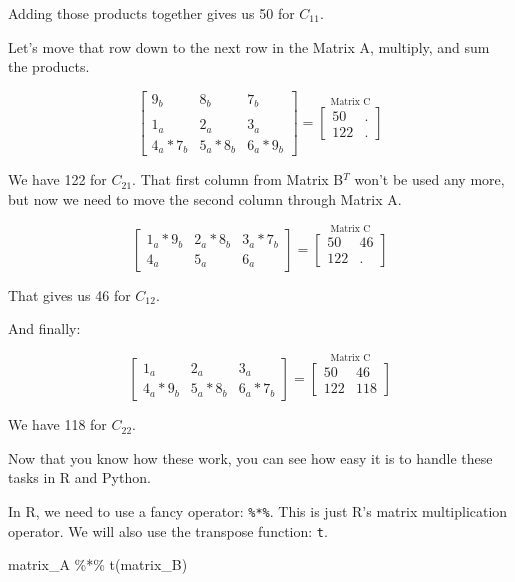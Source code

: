 \documentclass[
]{krantz}
\newenvironment{Shaded}{\begin{snugshade}}{\end{snugshade}}
\newcommand{\FunctionTok}[1]{\textcolor[rgb]{0.28,0.35,0.67}{#1}}
\newcommand{\NormalTok}[1]{\textcolor[rgb]{0.00,0.23,0.31}{#1}}
\newcommand{\SpecialCharTok}[1]{\textcolor[rgb]{0.37,0.37,0.37}{#1}}
\begin{document}
Adding those products together gives us 50 for \(C_{11}\).

Let's move that row down to the next row in the Matrix A, multiply, and
sum the products.

\[
\begin{bmatrix}
9_{b} & 8_{b} & 7_{b} \\
\\
1_{a} & 2_{a} & 3_{a}\\
4_{a}*7_{b} & 5_{a}*8_{b} & 6_{a}*9_{b}
\end{bmatrix}
= 
\stackrel{\mbox{Matrix C}}{
\begin{bmatrix}
50 & .\\
122 & .
\end{bmatrix}
}
\]

We have 122 for \(C_{21}\). That first column from Matrix B\(^T\) won't
be used any more, but now we need to move the second column through
Matrix A.

\[
\begin{bmatrix}
1_{a}*9_{b} & 2_{a}*8_{b} & 3_{a}*7_{b}\\
4_{a} & 5_{a} & 6_{a}
\end{bmatrix}
= 
\stackrel{\mbox{Matrix C}}{
\begin{bmatrix}
50 & 46\\
122 & .
\end{bmatrix}
}
\]

That gives us 46 for \(C_{12}\).

And finally:

\[
\begin{bmatrix}
1_{a} & 2_{a} & 3_{a}\\
4_{a}*9_{b} & 5_{a}*8_{b} & 6_{a}*7_{b}
\end{bmatrix}
=
\stackrel{\mbox{Matrix C}}{
\begin{bmatrix}
50 & 46\\
122 & 118
\end{bmatrix}
}
\]

We have 118 for \(C_{22}\).

Now that you know how these work, you can see how easy it is to handle
these tasks in R and Python.

In R, we need to use a fancy operator: \texttt{\%*\%}. This is just R's
matrix multiplication operator. We will also use the transpose function:
\texttt{t}.

\begin{Shaded}
\begin{Highlighting}[]
\NormalTok{matrix\_A }\SpecialCharTok{\%*\%} \FunctionTok{t}\NormalTok{(matrix\_B)}
\end{Highlighting}
\end{Shaded}
\end{document}
